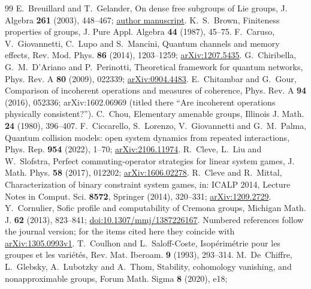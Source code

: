 \begin{thebibliography}{99}
 E.~Breuillard and T.~Gelander, On dense free subgroups of Lie groups,
J. Algebra \textbf{261} (2003), 448--467;
\href{https://www.imo.universite-paris-saclay.fr/~breuilla/6dense.pdf}{author manuscript}.
 K.~S.~Brown, Finiteness properties of groups, J. Pure Appl. Algebra \textbf{44} (1987), 45--75.
 F.~Caruso, V.~Giovannetti, C.~Lupo and S.~Mancini, Quantum channels and memory effects,
Rev. Mod. Phys. \textbf{86} (2014), 1203--1259; \href{https://arxiv.org/abs/1207.5435}{arXiv:1207.5435}.
 G.~Chiribella, G.~M.~D'Ariano and P.~Perinotti,
Theoretical framework for quantum networks, Phys. Rev. A \textbf{80} (2009), 022339;
\href{https://arxiv.org/abs/0904.4483}{arXiv:0904.4483}.
 E.~Chitambar and G.~Gour, Comparison of incoherent operations and measures of coherence,
Phys. Rev. A \textbf{94} (2016), 052336; arXiv:1602.06969 (titled there ``Are incoherent operations physically consistent?'').
 C.~Chou, Elementary amenable groups, Illinois J. Math. \textbf{24} (1980), 396--407.
 F.~Ciccarello, S.~Lorenzo, V.~Giovannetti and G.~M.~Palma,
Quantum collision models: open system dynamics from repeated interactions,
Phys. Rep. \textbf{954} (2022), 1--70; \href{https://arxiv.org/abs/2106.11974}{arXiv:2106.11974}.
 R.~Cleve, L.~Liu and W.~Slofstra, Perfect commuting-operator strategies for linear system games,
J. Math. Phys. \textbf{58} (2017), 012202; \href{https://arxiv.org/abs/1606.02278}{arXiv:1606.02278}.
 R.~Cleve and R.~Mittal, Characterization of binary constraint system games, in: ICALP 2014,
Lecture Notes in Comput. Sci. \textbf{8572}, Springer (2014), 320--331; \href{https://arxiv.org/abs/1209.2729}{arXiv:1209.2729}.
 Y.~Cornulier, Sofic profile and computability of Cremona groups,
Michigan Math. J. \textbf{62} (2013), 823--841;
\href{https://doi.org/10.1307/mmj/1387226167}{doi:10.1307/mmj/1387226167}. Numbered references follow the journal
version; for the items cited here they coincide with \href{https://arxiv.org/abs/1305.0993v1}{arXiv:1305.0993v1}.
 T.~Coulhon and L.~Saloff-Coste, Isop\'erim\'etrie pour les groupes et les vari\'et\'es, Rev. Mat. Iberoam. \textbf{9} (1993), 293--314.
 M.~De~Chiffre, L.~Glebsky, A.~Lubotzky and A.~Thom,
Stability, cohomology vanishing, and nonapproximable groups, Forum Math. Sigma \textbf{8} (2020), e18;

\end{thebibliography}
